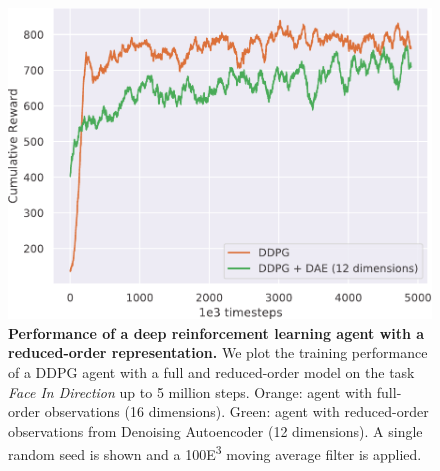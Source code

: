 \documentclass[letterpaper, 10 pt, conference]{ieeeconf}
\begin{document}


\begin{figure}[t]
    \centering
    \includegraphics[width=\linewidth]{figure7plus}
    \caption{
        \textbf{Performance of a deep reinforcement learning agent with a reduced-order representation.}
        We plot the training performance of a DDPG agent with a full and reduced-order model on the task \textit{Face In Direction} up to 5 million steps.
        Orange: agent with full-order observations (16 dimensions).
        Green: agent with reduced-order observations from Denoising Autoencoder (12 dimensions).
        A single random seed is shown and a 100{\tiny E}\textsuperscript{3} moving average filter is applied.
    }
    \label{fig:ae-perf}
\end{figure}
\end{document}
